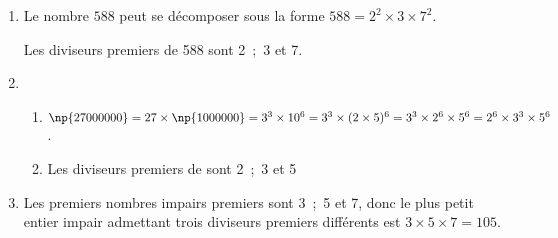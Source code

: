 
\medskip

\begin{enumerate}
\item Le nombre $588$ peut se décomposer sous la forme $588 = 2^2 \times  3 \times 7^2$.

Les diviseurs premiers de 588 sont 2~;~3 et 7.
\item 
	\begin{enumerate}
		\item %
$\np{27000000} = 27 \times \np{1000000} = 3^3 \times 10^6 = 3^3 \times (2 \times 5)^{6} = 3^3 \times 2^6 \times 5^6 = 2^6 \times 3^3 \times 5^6$.
		\item %
		Les diviseurs premiers de  sont 2~;~3 et 5
	\end{enumerate}
\item %
Les premiers nombres impairs premiers sont 3~;~5 et 7, donc le plus petit entier impair admettant trois diviseurs premiers différents est $3 \times 5 \times 7 = 105$.
\end{enumerate}

\vspace{0,5cm}

